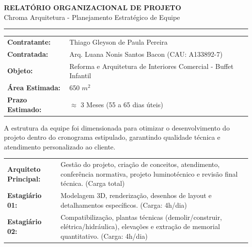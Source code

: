 \documentclass[11pt,a4paper]{article}
\begin{document}
\begin{center}
    {\Huge \bfseries \color{primary} RELATÓRIO ORGANIZACIONAL DE PROJETO} \\[0.3cm]
    {\Large \color{secondary} Chroma Arquitetura - Planejamento Estratégico de Equipe} \\[0.5cm]
    \rule{\linewidth}{1.5pt}
\end{center}

\vspace{0.2cm}

\begin{tcolorbox}[boxmodern, title=$1.$ Dados do Projeto]
\renewcommand{\arraystretch}{1.4}
\begin{tabularx}{\textwidth}{@{}lX@{}}
\textbf{Contratante:} & Thiago Gleyson de Paula Pereira \\
\textbf{Contratada:} & Arq. Luana Nonis Santos Bacon (CAU: A133892-7) \\
\textbf{Objeto:} & Reforma e Arquitetura de Interiores Comercial - Buffet Infantil \\
\textbf{Área Estimada:} & 650 $m^2$ \\
\textbf{Prazo Estimado:} & $\approx$ 3 Meses (55 a 65 dias úteis) \\
\end{tabularx}
\end{tcolorbox}

\vspace{0.3cm}

\begin{tcolorbox}[boxmodern, title=$2.$ Composição da Equipe e Carga Horária]
A estrutura da equipe foi dimensionada para otimizar o desenvolvimento do projeto dentro do cronograma estipulado, garantindo qualidade técnica e atendimento personalizado ao cliente.

\vspace{0.2cm}
\renewcommand{\arraystretch}{1.4}
\begin{tabularx}{\textwidth}{@{}lX@{}}
\textbf{Arquiteto Principal:} & Gestão do projeto, criação de conceitos, atendimento, conferência normativa, projeto luminotécnico e revisão final técnica. (Carga total) \\
\textbf{Estagiário 01:} & Modelagem 3D, renderização, desenhos de layout e detalhamentos específicos. (Carga: 4h/dia) \\
\textbf{Estagiário 02:} & Compatibilização, plantas técnicas (demolir/construir, elétrica/hidráulica), elevações e extração de memorial quantitativo. (Carga: 4h/dia) \\
\end{tabularx}
\end{tcolorbox}
\end{document}
